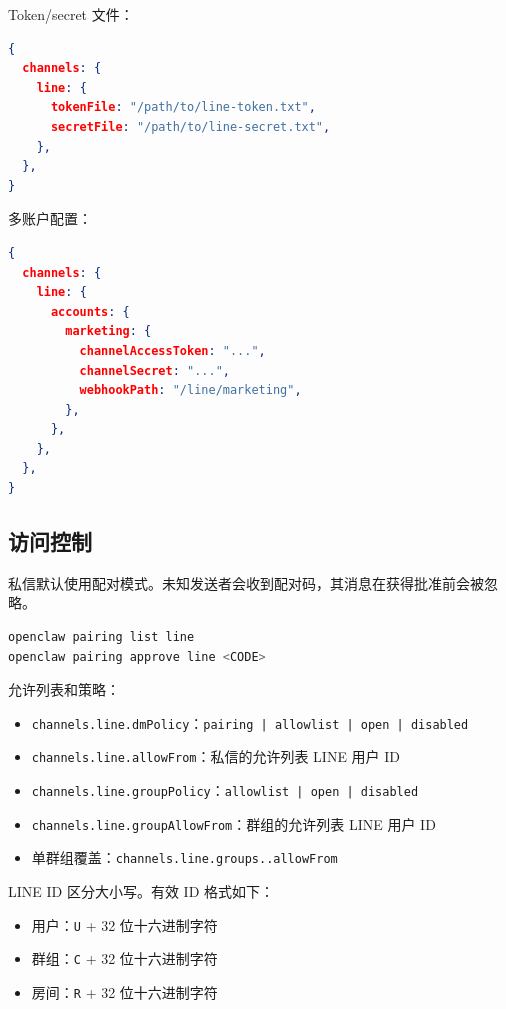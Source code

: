 Token/secret 文件：

\begin{lstlisting}[language=json]
{
  channels: {
    line: {
      tokenFile: "/path/to/line-token.txt",
      secretFile: "/path/to/line-secret.txt",
    },
  },
}
\end{lstlisting}


多账户配置：

\begin{lstlisting}[language=json]
{
  channels: {
    line: {
      accounts: {
        marketing: {
          channelAccessToken: "...",
          channelSecret: "...",
          webhookPath: "/line/marketing",
        },
      },
    },
  },
}
\end{lstlisting}


\subsection{访问控制}


私信默认使用配对模式。未知发送者会收到配对码，其消息在获得批准前会被忽略。

\begin{lstlisting}[language=bash]
openclaw pairing list line
openclaw pairing approve line <CODE>
\end{lstlisting}


允许列表和策略：

\begin{itemize}
  \item \texttt{channels.line.dmPolicy}：\texttt{pairing | allowlist | open | disabled}
  \item \texttt{channels.line.allowFrom}：私信的允许列表 LINE 用户 ID
  \item \texttt{channels.line.groupPolicy}：\texttt{allowlist | open | disabled}
  \item \texttt{channels.line.groupAllowFrom}：群组的允许列表 LINE 用户 ID
  \item 单群组覆盖：\texttt{channels.line.groups..allowFrom}
\end{itemize}


LINE ID 区分大小写。有效 ID 格式如下：

\begin{itemize}
  \item 用户：\texttt{U} + 32 位十六进制字符
  \item 群组：\texttt{C} + 32 位十六进制字符
  \item 房间：\texttt{R} + 32 位十六进制字符
\end{itemize}


